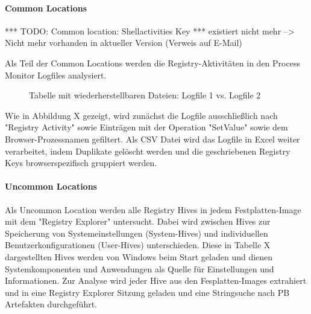 \paragraph*{Common Locations}
*** TODO: Common location: Shellactivities Key ***
	existiert nicht mehr --> Nicht mehr vorhanden in aktueller Version (Verweis auf E-Mail)

Als Teil der Common Locations werden die Registry-Aktivitäten in den Process Monitor Logfiles analysiert.
\begin{figure}[h!]
	\centerline{}
	\caption{Tabelle mit wiederherstellbaren Dateien: Logfile 1 vs. Logfile 2}
\end{figure}
Wie in Abbildung X gezeigt, wird zunächst die Logfile ausschließlich nach "Registry Activity" sowie Einträgen mit der Operation "SetValue" sowie dem Browser-Prozessnamen gefiltert.
Als CSV Datei wird das Logfile in Excel weiter verarbeitet, indem Duplikate gelöscht werden und die geschriebenen Registry Keys browserspezifisch gruppiert werden.
	
\paragraph*{Uncommon Locations}
Als Uncommon Location werden alle Registry Hives in jedem Festplatten-Image mit dem "Registry Explorer" untersucht.
Dabei wird zwischen Hives zur Speicherung von Systemeinstellungen (System-Hives) und individuellen Benutzerkonfigurationen (User-Hives) unterschieden. Diese in Tabelle X dargestellten Hives werden von Windows beim Start geladen und dienen Systemkomponenten und Anwendungen als Quelle für Einstellungen und Informationen.	
Zur Analyse wird jeder Hive aus den Fesplatten-Images extrahiert und in eine Registry Explorer Sitzung geladen und eine Stringsuche nach PB Artefakten durchgeführt.

